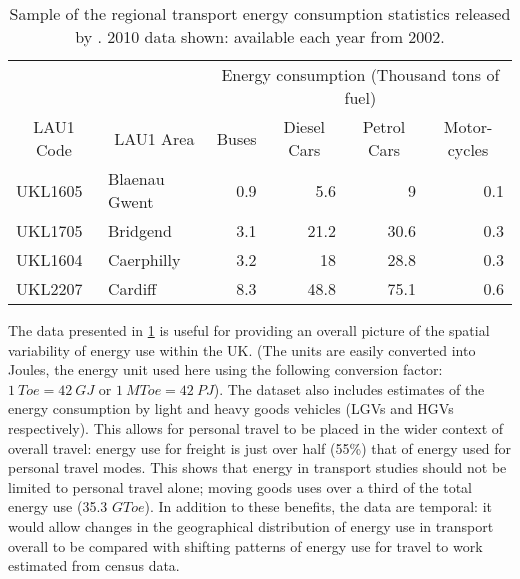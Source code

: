 \begin{table}[h]
\centerline{}
\caption[Sample of regional transport energy consumption statistics]
{Sample of the regional transport energy consumption statistics released by
\citet{Decc2013-regcons}. 2010 data shown: available each year from 2002.}
\begin{tabular}{llrrrr}
\toprule
\multicolumn{1}{c}{} & \multicolumn{1}{c}{} & \multicolumn{ 4}{c}{Energy consumption (Thousand tons of fuel)} \\
\cmidrule{3-6}
\multicolumn{1}{c}{LAU1 Code} & \multicolumn{1}{c}{LAU1 Area} & \multicolumn{1}{c}{Buses} & \multicolumn{1}{c}{Diesel Cars} & \multicolumn{1}{c}{Petrol Cars} & \multicolumn{1}{c}{Motor-cycles} \\
\midrule
UKL1605 & Blaenau Gwent & 0.9 & 5.6 & 9 & 0.1 \\
UKL1705 & Bridgend & 3.1 & 21.2 & 30.6 & 0.3 \\
UKL1604 & Caerphilly & 3.2 & 18 & 28.8 & 0.3 \\
UKL2207 & Cardiff & 8.3 & 48.8 & 75.1 & 0.6 \\
\bottomrule
\end{tabular}
\label{t:deccdata}
\end{table}

The data presented in \cref{t:deccdata} is useful for providing an overall
picture of the spatial variability of energy use within the UK. (The units are
easily converted into Joules, the energy unit used here using the
following conversion factor: $1~Toe = 42~GJ$ or $1~MToe = 42~PJ$). The dataset
also includes estimates of the energy consumption by light and heavy goods
vehicles (LGVs and HGVs respectively). This allows for personal travel to be
placed in the wider context of overall travel: energy use for freight is just over
half (55\%) that of energy used for personal travel modes. This shows that
energy in transport
studies should not be limited to personal travel alone; moving goods
uses over a third of the total energy use (35.3 $GToe$). In addition to these
benefits, the data are temporal: it would allow changes in the geographical
distribution of energy use in transport overall to be compared with shifting
patterns of energy use for travel to work estimated from census data.

